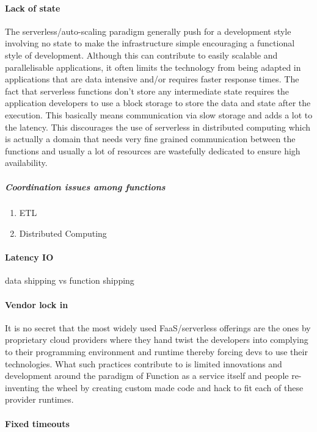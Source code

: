 \documentclass[12pt]{article}
\begin{document}
\paragraph{Lack of state}
\label{sec:org2021c37}
The serverless/auto-scaling paradigm generally push for a development style
involving no state to make the infrastructure simple encouraging a functional
style of development. Although this can contribute to easily scalable and
parallelisable applications, it often limits the technology from being adapted
in applications that are data intensive and/or requires faster response times.
The fact that serverless functions don't store any intermediate state requires
the application developers to use a block storage to store the data and state
after the execution. This basically means communication via slow storage and
adds a lot to the latency. This discourages the use of serverless in distributed
computing which is actually a domain that needs very fine grained communication
between the functions and usually a lot of resources are wastefully dedicated to
ensure high availability.
\subparagraph{Coordination issues among functions}
\label{sec:org8912324}
\begin{enumerate}
\item ETL
\label{sec:org5f863da}
\item Distributed Computing
\label{sec:org4c04fe9}
\end{enumerate}
\paragraph{Latency IO}
\label{sec:org2b77608}
data shipping vs function shipping
\paragraph{Vendor lock in}
\label{sec:org5b23440}
It is no secret that the most widely used FaaS/serverless offerings are the ones by
proprietary cloud providers where they hand twist the developers into complying
to their programming environment and runtime thereby forcing devs to use their
technologies. What such practices contribute to is limited innovations and
development around the paradigm of Function as a service itself and people
re-inventing the wheel by creating custom made code and hack to fit each of
these provider runtimes.
\paragraph{Fixed timeouts}
\label{sec:org7500c49}
\end{document}

